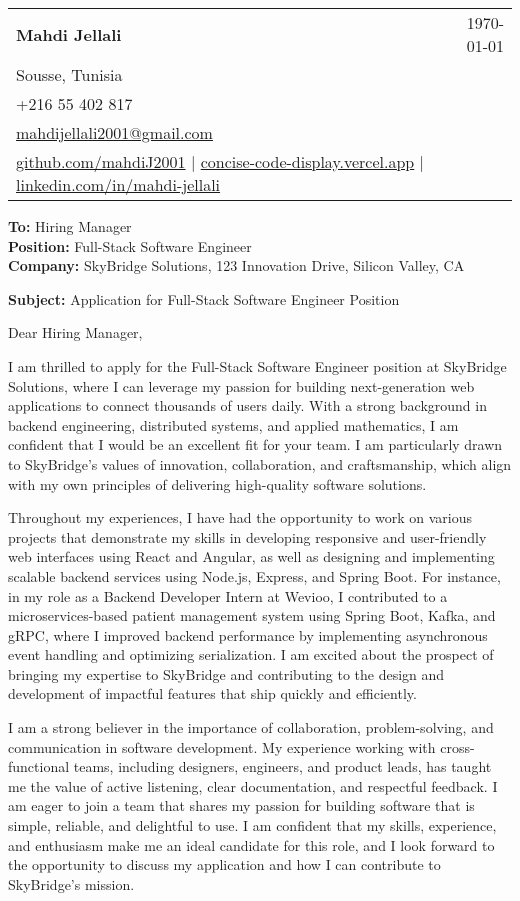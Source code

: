 \documentclass[letterpaper,11pt]{article}
\makeatletter
\newcommand{\letterHeading}[5]{
    \begin{tabular*}{\textwidth}{l@{\extracolsep{\fill}}r}
    \textbf{\Large #1} & #5 \\  %
    #2 & \\
    #3 & \\
    #4 & \\
    \end{tabular*}
    \vspace{15pt}
}
\newcommand{\letterRecipient}[3]{
    \textbf{\large To:} #1 \\
    \textbf{\large Position:} #2 \\
    \textbf{\large Company:} #3 \\
    \vspace{12pt}
}
\newcommand{\letterSubject}[1]{
    \textbf{\large Subject:} #1 \\
    \vspace{15pt}
}
\makeatother
\begin{document}
    \letterHeading
    {Mahdi Jellali}
    {Sousse, Tunisia}
    {+216 55 402 817 \\ \href{mailto:mahdijellali2001@gmail.com}{mahdijellali2001@gmail.com}}
    {\href{https://github.com/mahdiJ2001}{github.com/mahdiJ2001} $|$ \href{https://concise-code-display.vercel.app/}{concise-code-display.vercel.app} $|$ \href{https://www.linkedin.com/in/mahdi-jellali/}{linkedin.com/in/mahdi-jellali}}
    {\today}

    \letterRecipient
    {Hiring Manager}
    {Full-Stack Software Engineer}
    {SkyBridge Solutions, 123 Innovation Drive, Silicon Valley, CA}

    \letterSubject{Application for Full-Stack Software Engineer Position}

    Dear Hiring Manager,

    I am thrilled to apply for the Full-Stack Software Engineer position at SkyBridge Solutions, where I can leverage my passion for building next-generation web applications to connect thousands of users daily. With a strong background in backend engineering, distributed systems, and applied mathematics, I am confident that I would be an excellent fit for your team. I am particularly drawn to SkyBridge's values of innovation, collaboration, and craftsmanship, which align with my own principles of delivering high-quality software solutions.

    Throughout my experiences, I have had the opportunity to work on various projects that demonstrate my skills in developing responsive and user-friendly web interfaces using React and Angular, as well as designing and implementing scalable backend services using Node.js, Express, and Spring Boot. For instance, in my role as a Backend Developer Intern at Wevioo, I contributed to a microservices-based patient management system using Spring Boot, Kafka, and gRPC, where I improved backend performance by implementing asynchronous event handling and optimizing serialization. I am excited about the prospect of bringing my expertise to SkyBridge and contributing to the design and development of impactful features that ship quickly and efficiently.

    I am a strong believer in the importance of collaboration, problem-solving, and communication in software development. My experience working with cross-functional teams, including designers, engineers, and product leads, has taught me the value of active listening, clear documentation, and respectful feedback. I am eager to join a team that shares my passion for building software that is simple, reliable, and delightful to use. I am confident that my skills, experience, and enthusiasm make me an ideal candidate for this role, and I look forward to the opportunity to discuss my application and how I can contribute to SkyBridge's mission.
\end{document}
